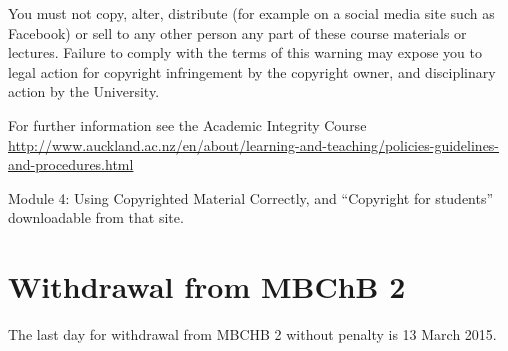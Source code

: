 \documentclass[11pt,fleqn]{book} %
\begin{document}
You must not copy, alter, distribute (for example on a social media site such as Facebook) or sell to any other person any part of these course materials or lectures. Failure to comply with the terms of this warning may expose you to legal action for copyright infringement by the copyright owner, and disciplinary action by the University.

For further information see the Academic Integrity Course
\url{http://www.auckland.ac.nz/en/about/learning-and-teaching/policies-guidelines-and-procedures.html}

Module 4: Using Copyrighted Material Correctly, and ``Copyright for students'' downloadable from that site.


\section{Withdrawal from MBChB 2}
\begin{remark}
The last day for withdrawal from MBCHB 2 without penalty is 13 March 2015.
\end{remark}
\end{document}

